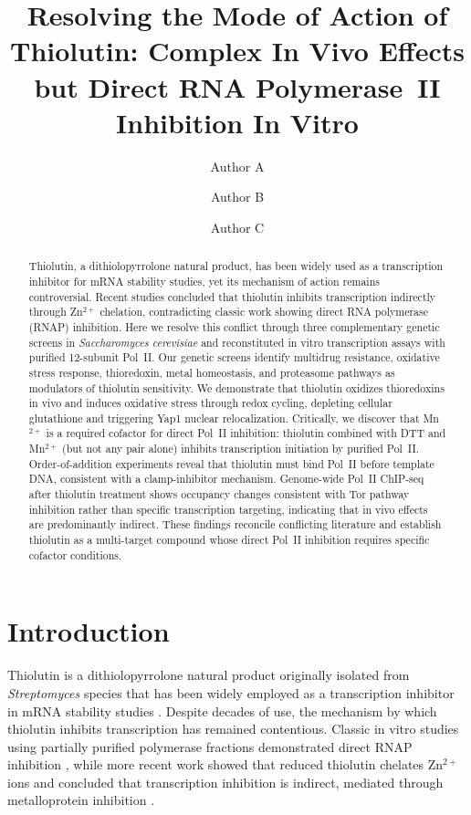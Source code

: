 \documentclass[11pt,a4paper]{article}
\title{Resolving the Mode of Action of Thiolutin: Complex In Vivo Effects but Direct RNA Polymerase~II Inhibition In Vitro}
\author[1]{Author A}
\author[1]{Author B}
\author[1,2]{Author C}
\affil[1]{Department of Biochemistry, Stanford University, Stanford, CA, USA}
\affil[2]{Corresponding author: \texttt{author.c@stanford.edu}}
\date{}
\begin{document}
\maketitle

\begin{abstract}
Thiolutin, a dithiolopyrrolone natural product, has been widely used as a transcription inhibitor for mRNA stability studies, yet its mechanism of action remains controversial. Recent studies concluded that thiolutin inhibits transcription indirectly through Zn$^{2+}$ chelation, contradicting classic work showing direct RNA polymerase (RNAP) inhibition. Here we resolve this conflict through three complementary genetic screens in \textit{Saccharomyces cerevisiae} and reconstituted in vitro transcription assays with purified 12-subunit Pol~II. Our genetic screens identify multidrug resistance, oxidative stress response, thioredoxin, metal homeostasis, and proteasome pathways as modulators of thiolutin sensitivity. We demonstrate that thiolutin oxidizes thioredoxins in vivo and induces oxidative stress through redox cycling, depleting cellular glutathione and triggering Yap1 nuclear relocalization. Critically, we discover that Mn$^{2+}$ is a required cofactor for direct Pol~II inhibition: thiolutin combined with DTT and Mn$^{2+}$ (but not any pair alone) inhibits transcription initiation by purified Pol~II. Order-of-addition experiments reveal that thiolutin must bind Pol~II before template DNA, consistent with a clamp-inhibitor mechanism. Genome-wide Pol~II ChIP-seq after thiolutin treatment shows occupancy changes consistent with Tor pathway inhibition rather than specific transcription targeting, indicating that in vivo effects are predominantly indirect. These findings reconcile conflicting literature and establish thiolutin as a multi-target compound whose direct Pol~II inhibition requires specific cofactor conditions.
\end{abstract}

\section{Introduction}

Thiolutin is a dithiolopyrrolone natural product originally isolated from \textit{Streptomyces} species that has been widely employed as a transcription inhibitor in mRNA stability studies \citep{Jimenez1973, Parker1991, Pelechano2010}. Despite decades of use, the mechanism by which thiolutin inhibits transcription has remained contentious. Classic in vitro studies using partially purified polymerase fractions demonstrated direct RNAP inhibition \citep{Tipper1973, Khachatourians1975}, while more recent work showed that reduced thiolutin chelates Zn$^{2+}$ ions and concluded that transcription inhibition is indirect, mediated through metalloprotein inhibition \citep{Lauber2016, Chan2017}.
\end{document}
